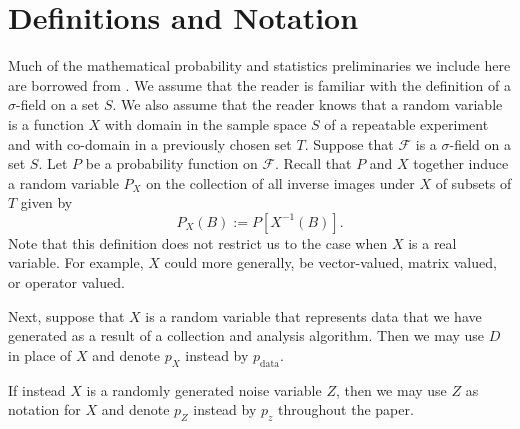 \documentclass[12pt]{amsart}
\theoremstyle{definition}
\theoremstyle{remark}
\begin{document}
\section{Definitions and Notation} 

Much of the mathematical probability and statistics preliminaries we include here
are borrowed from \cite{Clahaneprob}. We assume 
that the reader is familiar with the definition of a $\sigma$-field on a set $S$.
We also assume that the reader knows that a random variable is a function $X$ 
with domain in the sample space $S$ of a repeatable experiment and with co-domain
in a previously chosen set $T$. Suppose that ${\mathcal F}$ is a $\sigma$-field on a
set $S$. Let $P$ be a probability function on ${\mathcal F}$. Recall that $P$ 
and $X$ together induce a random variable $P_X$ on the collection of all inverse
images under $X$ of subsets of $T$ given by
\begin{equation*}
P_X(B):=P[X^{-1}(B)].
\end{equation*}
Note that this definition does not restrict us to the case when $X$ is a real 
variable. For example, $X$ could more generally, be vector-valued, matrix valued,
or operator valued.

Next, suppose that $X$ is a random variable that represents data that we have 
generated as a result of a collection and analysis algorithm. Then 
we may use $D$ in place of $X$ and denote $p_X$ instead by $p_{\text{data}}$.

If instead $X$ is a randomly generated noise variable $Z$, then we may use $Z$ 
as notation for $X$ and denote $p_Z$ instead by $p_z$ throughout the paper.
\end{document}
